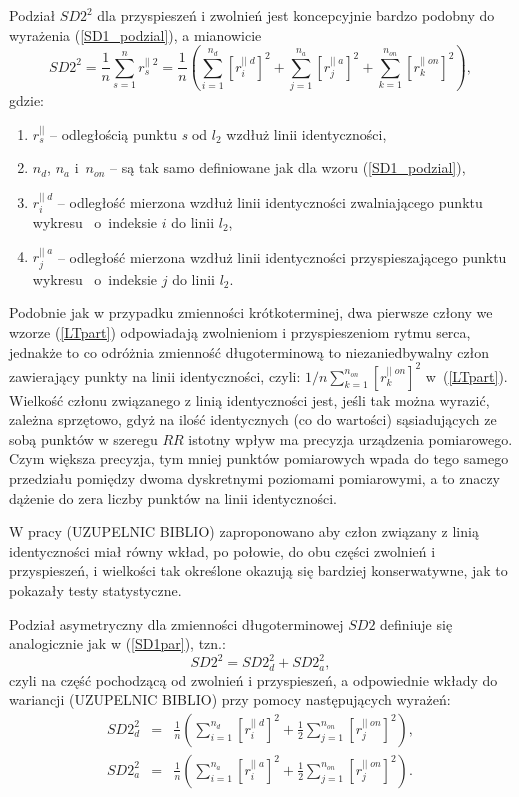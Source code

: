 Podział $SD2^2$ dla przyspieszeń i zwolnień jest koncepcyjnie bardzo podobny do wyrażenia
(\ref{SD1_podzial}), a mianowicie
\begin{equation}
SD2^2= \frac{1}{n}\sum_{s=1}^{n}r^{||\;2}_{s}=\frac{1}{n}\left(\sum_{i=1}^{n_{d}}[r^{||\;d}_{i}]^{2}+\sum_{j=1}^{n_{a}}[r^{||\;a}_{j}]^{2}+\sum_{k=1}^{n_{on}}[r^{||\;on}_{k}]^{2}\right), \label{LTpart}
\end{equation}
gdzie:  
\begin{enumerate}
\item[]$r^{||}_{s}$ -- odległością punktu \emph{s} od $l_{2}$ wzdłuż linii identyczności,
\item[]$n_{d}$, $n_{a}$ i~$n_{on}$ -- są tak samo definiowane jak dla wzoru (\ref{SD1_podzial}), 
\item[]$r^{||\;d}_{i}$ -- odległość mierzona wzdłuż linii identyczności zwalniającego punktu  wykresu \PP\ o~indeksie $i$ do linii $l_{2}$,
\item[]$r^{||\;a}_{j}$ -- odległość mierzona wzdłuż linii identyczności przyspieszającego punktu  wykresu \PP\ o~indeksie $j$ do linii $l_{2}$.
\end{enumerate}
Podobnie jak w przypadku zmienności krótkoterminej, dwa pierwsze człony we wzorze (\ref{LTpart})
odpowiadają zwolnieniom i przyspieszeniom rytmu serca, jednakże to co odróżnia zmienność
długoterminową to niezaniedbywalny człon zawierający punkty na linii identyczności, czyli:
$1/n\sum_{k=1}^{n_{on}}[r^{||\;on}_{k}]^{2}$ w~(\ref{LTpart}). Wielkość członu związanego
z linią identyczności jest, jeśli tak można wyrazić, zależna sprzętowo, gdyż na ilość 
identycznych (co do wartości) sąsiadujących ze sobą punktów w szeregu $RR$ istotny wpływ ma
precyzja urządzenia pomiarowego. Czym większa precyzja, tym mniej punktów pomiarowych
wpada do tego samego przedziału pomiędzy dwoma dyskretnymi poziomami pomiarowymi, a to
znaczy dążenie do zera liczby punktów na linii identyczności. 

W pracy (UZUPELNIC BIBLIO) zaproponowano aby człon związany z linią identyczności miał
równy wkład, po połowie, do obu części zwolnień i przyspieszeń, i wielkości tak określone
okazują się bardziej konserwatywne, jak to pokazały testy statystyczne.
 
Podział asymetryczny dla zmienności długoterminowej $SD2$ definiuje się analogicznie jak w 
 (\ref{SD1par}), tzn.:
\begin{equation}
SD2^{2}=SD2_{d}^{2}+SD2_{a}^{2}, \label{SD2part}
\end{equation}
czyli na część pochodzącą od zwolnień i przyspieszeń, a odpowiednie wkłady do wariancji
(UZUPELNIC BIBLIO) przy pomocy następujących wyrażeń:
\begin{eqnarray}
SD2_{d}^{2}&=&\frac{1}{n}\left(\sum_{i=1}^{n_{d}}[r^{||\;d}_{i}]^{2}+\frac{1}{2}\sum_{j=1}^{n_{on}}[r^{||\;on}_{j}]^{2}\right),\label{LTpartdef}\\
SD2_{a}^{2}&=&\frac{1}{n}\left(\sum_{i=1}^{n_{a}}[r^{||\;a}_{i}]^{2}+\frac{1}{2}\sum_{j=1}^{n_{on}}[r^{||\;on}_{j}]^{2}\right). \nonumber
\end{eqnarray}

